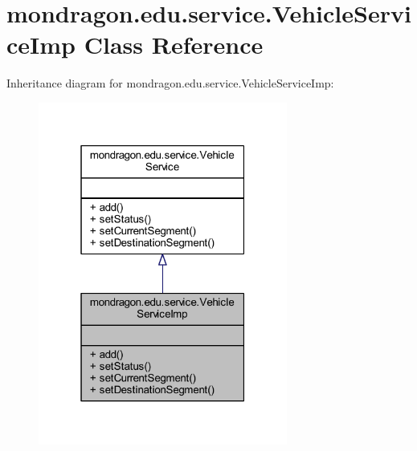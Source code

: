 \hypertarget{classmondragon_1_1edu_1_1service_1_1_vehicle_service_imp}{}\section{mondragon.\+edu.\+service.\+Vehicle\+Service\+Imp Class Reference}
\label{classmondragon_1_1edu_1_1service_1_1_vehicle_service_imp}


Inheritance diagram for mondragon.\+edu.\+service.\+Vehicle\+Service\+Imp\+:\nopagebreak
\begin{figure}[H]
\begin{center}
\leavevmode
\includegraphics[width=232pt]{classmondragon_1_1edu_1_1service_1_1_vehicle_service_imp__inherit__graph}
\end{center}
\end{figure}


